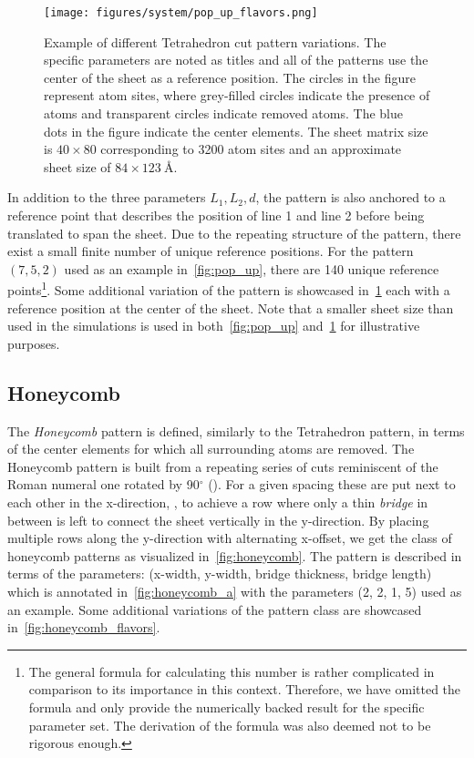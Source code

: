 \begin{figure}[!htb]
  \centering
  \texttt{[image: figures/system/pop\_up\_flavors.png]}
  \caption{Example of different Tetrahedron cut pattern variations. The specific parameters are noted as titles and all of the patterns use the center of the sheet as a reference position. The circles in the figure represent atom sites, where grey-filled circles indicate the presence of atoms and transparent circles indicate removed atoms. The blue dots in the figure indicate the center elements. The sheet matrix size is $40 \times 80$ corresponding to 3200 atom sites and an approximate sheet size of $84 \times \SI{123}{\text{Å}}$.}
  \label{fig:pop_up_flavors}
\end{figure}

In addition to the three parameters $L_1, L_2, d$, the pattern is also anchored
to a reference point that describes the position of line 1 and line 2 before
being translated to span the sheet. Due to the repeating structure of the
pattern, there exist a small finite number of unique reference positions. For
the pattern $(7, 5, 2)$ used as an example in~\cref{fig:pop_up}, there are
140 unique reference points\footnote{The general formula for calculating this number is rather
complicated in comparison to its importance in this context. Therefore, we have
omitted the formula and only provide the numerically backed result for the
specific parameter set. The derivation of the formula was also deemed not to be
rigorous enough.}. Some additional variation of the
pattern is showcased in~\cref{fig:pop_up_flavors} each with a reference position
at the center of the sheet. Note that a smaller sheet size than used in the simulations is used in
both~\cref{fig:pop_up} and~\cref{fig:pop_up_flavors} for illustrative purposes.



\subsection{Honeycomb}
The \textit{Honeycomb} pattern is defined, similarly to the Tetrahedron pattern,
in terms of the center elements for which all surrounding atoms are removed. The
Honeycomb pattern is built from a repeating series of cuts reminiscent of the
Roman numeral one rotated by 90$^{\circ}$
(). For a given spacing
these are put next to each other in the x-direction,
, to achieve a row
where only a thin \textit{bridge} in between is left to connect the sheet
vertically in the y-direction. By placing multiple rows along the y-direction
with alternating x-offset, we get the class of honeycomb patterns as visualized
in~\cref{fig:honeycomb}. The pattern is described in terms of the parameters:
(x-width, y-width, bridge thickness, bridge length) which is annotated
in~\cref{fig:honeycomb_a} with the parameters (2, 2, 1, 5) used as an example.
Some additional variations of the pattern class are showcased
in~\cref{fig:honeycomb_flavors}.


